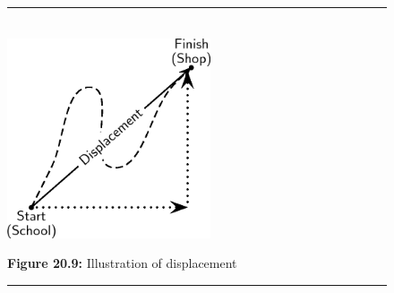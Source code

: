       
    \setcounter{subfigure}{0}


	\begin{figure}[H] %
    \begin{center}
    \rule[.1in]{\figurerulewidth}{.005in} \\
        \label{m38788*uid17!!!underscore!!!media}\label{m38788*uid17!!!underscore!!!printimage}\includegraphics[width=6cm]{col11305.imgs/m38788_PG10C2_008.png} %
        
      \vspace{2pt}
    \vspace{\rubberspace}\par \begin{cnxcaption}
	  \small \textbf{Figure 20.9: }Illustration of displacement
	\end{cnxcaption}
      
    \vspace{.1in}
    \rule[.1in]{\figurerulewidth}{.005in} \\
        
    \end{center}

 \end{figure}   

    \addtocounter{footnote}{-0}
    
